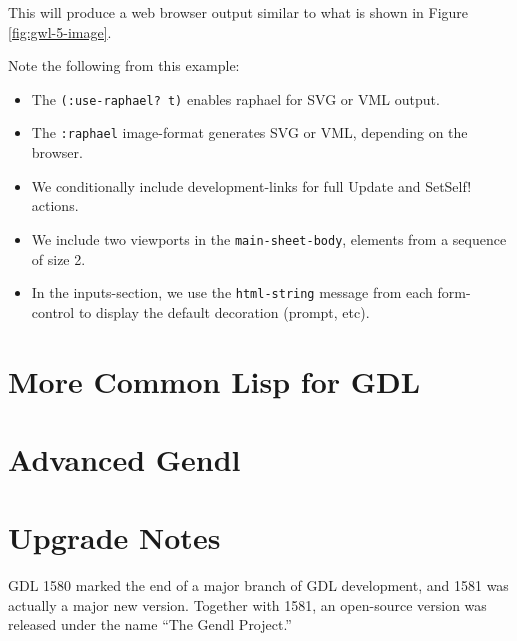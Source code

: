 \documentclass [11pt]{book}
\begin{document}
This will produce a web browser output similar to what is shown in Figure 
\ref{fig:gwl-5-image}.



Note the following from this example:

\begin{itemize}

\item The \texttt{(:use-raphael? t)} enables raphael for SVG or VML output.

\item The \texttt{:raphael} image-format generates SVG or VML, depending on the browser.

\item We conditionally include development-links for full Update and SetSelf! actions.

\item We include two viewports in the \texttt{main-sheet-body}, elements from a sequence of size 2.

\item In the inputs-section, we use
                  the \texttt{html-string} message from each
                  form-control to display the default
                  decoration (prompt, etc).

\end{itemize}





\chapter{More Common Lisp for GDL}

\label{chap:morecommonlispforgdl}



\chapter{Advanced Gendl}

\label{chap:advancedgendl}



\chapter*{Upgrade Notes}

\label{chap:upgradenotes}

GDL 1580 marked the end of a major branch of GDL development,
and 1581 was actually a major new version. Together with 1581, an
open-source version was released under the name ``The Gendl Project.''
\end{document}
